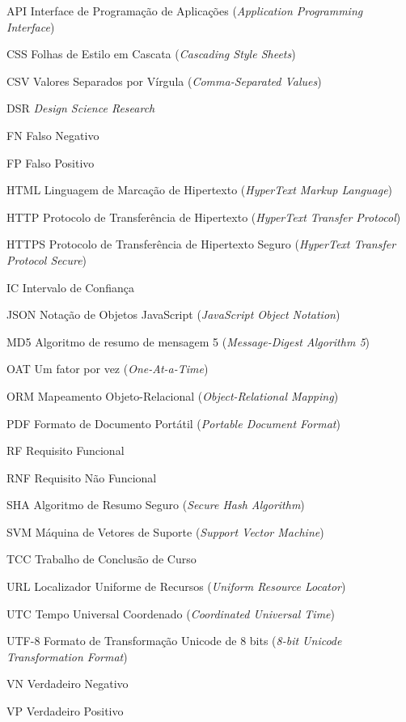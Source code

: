 \begin{siglas}
  \item[API]   Interface de Programação de Aplicações (\textit{Application
               Programming Interface})
  \item[CSS]   Folhas de Estilo em Cascata (\textit{Cascading Style Sheets})
  \item[CSV]   Valores Separados por Vírgula (\textit{Comma-Separated Values})
  \item[DSR]   \textit{Design Science Research}
  \item[FN]    Falso Negativo
  \item[FP]    Falso Positivo
  \item[HTML]  Linguagem de Marcação de Hipertexto (\textit{HyperText Markup
               Language})
  \item[HTTP]  Protocolo de Transferência de Hipertexto (\textit{HyperText
               Transfer Protocol})
  \item[HTTPS] Protocolo de Transferência de Hipertexto Seguro
               (\textit{HyperText Transfer Protocol Secure})
  \item[IC]    Intervalo de Confiança
  \item[JSON]  Notação de Objetos JavaScript (\textit{JavaScript Object
               Notation})
  \item[MD5]   Algoritmo de resumo de mensagem 5 (\textit{Message-Digest
               Algorithm 5})
  \item[OAT]   Um fator por vez (\textit{One-At-a-Time})
  \item[ORM]   Mapeamento Objeto-Relacional (\textit{Object-Relational
               Mapping})
  \item[PDF]   Formato de Documento Portátil (\textit{Portable Document Format})
  \item[RF]    Requisito Funcional
  \item[RNF]   Requisito Não Funcional
  \item[SHA]   Algoritmo de Resumo Seguro (\textit{Secure Hash Algorithm})
  \item[SVM]   Máquina de Vetores de Suporte (\textit{Support Vector Machine})
  \item[TCC]   Trabalho de Conclusão de Curso
  \item[URL]   Localizador Uniforme de Recursos (\textit{Uniform Resource
               Locator})
  \item[UTC]   Tempo Universal Coordenado (\textit{Coordinated Universal Time})
  \item[UTF-8] Formato de Transformação Unicode de 8 bits (\textit{8-bit
               Unicode Transformation Format})
  \item[VN]    Verdadeiro Negativo
  \item[VP]    Verdadeiro Positivo
\end{siglas}

